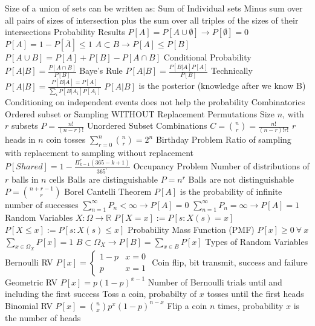 \documentclass[14pt]{extarticle}
\begin{document}
\begin{outline}
				\3	Size of a union of sets can be written as:
					\4	Sum of Individual sets
					\4	Minus sum over all pairs of sizes of intersection
					\4	plus the sum over all triples of the sizes of their intersections
			\2	Probability Results
				\3	$P[A] = P[A \cup \emptyset] \rightarrow P[\emptyset] = 0$
				\3	$P[A] = 1 - P[\bar{A}] \le 1$
				\3	$A \subset B \rightarrow P[A] \le P[B]$
				\3	$P[A \cup B] = P[A] + P[B] - P[A \cap B]$
		\1	Conditional Probability
			\2	$P[A | B] = \frac{P[A \cap B]}{P[B]}$
		\1	Baye's Rule
			\2	$P[A | B] = \frac{P[B|A] P[A]}{P[B]}$
				\3	Technically $P[A | B] = \frac{P[B | A] = P[A]}{\sum_i P[B|A_i]P[A_i]}$
			\2	$P[A |B]$ is the posterior (knowledge after we know B)
			\2	Conditioning on independent events does not help the probability
		\1	Combinatorics
			\2	Ordered subset or Sampling WITHOUT Replacement
				\3	Permutations	
				\3	Size $n$, with $r$ subsets
				\3	$P = \frac{n!}{(n - r)!}$
			\2	Unordered Subset 
				\3	Combinations
				\3	$C = \binom{n}{r} = \frac{n!}{(n-r)!r!}$
				\3	$r$ heads in $n$ coin tosses
				\3	$\sum_{r = 0}^n \binom{n}{r} = 2^n$
			\2	Birthday Problem
				\3	Ratio of sampling with replacement to sampling without replacement
				\3	$P[Shared] = 1 - \frac{\Pi_{k = 1}^r (365 - k + 1)}{365^r}$
			\2	Occupancy Problem
				\3	Number of distributions of $r$ balls in $n$ cells
				\3	Balls are distinguishable
					\4	$P = n^r$
				\3	Balls are not distinguishable
					\4	$P = \binom{n+r-1}{r}$
		\1	Borel Cantelli Theorem
			\2	$P[A]$ is the probability of infinite number of successes
			\2	$\sum_{n=1}^{\infty} P_n < \infty \rightarrow P[A] = 0$
			\2	$\sum_{n=1}^{\infty} P_n = \infty \rightarrow P[A] = 1$
		\1	Random Variables
			\2	$X : \Omega \rightarrow \mathbb{R}$
			\2	$P[X = x] := P[s : X(s) = x]$
			\2	$P[X \le x] := P[s : X(s) \le x]$
			\2	Probability Mass Function (PMF)
				\3	$P[x] \ge 0~\forall~x$
				\3	$\sum_{x \in \Omega_X}P[x] = 1$
				\3	$B \subset \Omega_X \rightarrow P[B] = \sum_{x \in B}P[x]$
		\1	Types of Random Variables
			\2	Bernoulli RV
				\3	$P[x] = \begin{cases} 1 - p & x = 0 \\ p & x = 1   \end{cases}$
				\3	Coin flip, bit transmit, success and failure
			\2	Geometric RV
				\3	$P[x] = p(1-p)^{x-1}$
				\3	Number of Bernoulli trials until and including the first success
				\3	Toss a coin, probabilty of $x$ tosses until the first heads
			\2	Binomial RV
				\3	$P[x] = \binom{n}{x}p^x(1-p)^{n-x}$
				\3	Flip a coin $n$ times, probability $x$ is the number of heads

\end{outline}
\end{document}
